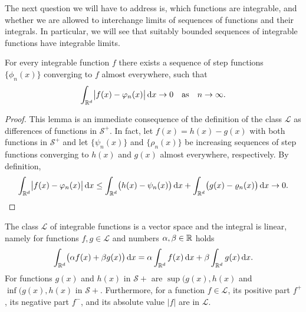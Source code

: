 \begin{intro}
  The next question we will have to address is, which functions are
  integrable, and whether we are allowed to interchange limits of
  sequences of functions and their integrals. In particular, we will
  see that suitably bounded sequences of integrable functions have
  integrable limits.
\end{intro}

\begin{lemma}
  For every integrable function $f$ there exists a sequence of step
  functions $\{\phi_n(x)\}$ converging to $f$ almost everywhere, such
  that
  \begin{gather*}
    \int_{\mathbb R^d} \bigl|f(x)-\varphi_n(x)\bigr|\,\mathrm{d} x \to 0
    \quad\text{as}\quad n\to \infty.
  \end{gather*}
\end{lemma}

\begin{proof}
  This lemma is an immediate consequence of the definition of the
  class $\mathcal L$ as differences of functions in $\mathcal S^+$. In
  fact, let $f(x) = h(x)-g(x)$ with both functions in $\mathcal
  S^+$ and let $\{\psi_n(x)\}$ and $\{\rho_n(x)\}$ be increasing
  sequences of step functions converging to $h(x)$ and $g(x)$
  almost everywhere, respectively. By definition,
  \begin{gather*}
    \int_{\mathbb R^d} \bigl|f(x)-\varphi_n(x)\bigr|\,\mathrm{d} x
    \le \int_{\mathbb R^d} \bigl(h(x)-\psi_n(x)\bigr)\,\mathrm{d} x
    + \int_{\mathbb R^d} \bigl(g(x)-\varrho_n(x)\bigr)\,\mathrm{d} x
    \to 0.
  \end{gather*}
\end{proof}

\begin{theorem}
  \label{theorem:integral:linearity}
  The class $\mathcal L$ of integrable functions is a vector space and
  the integral is linear, namely for functions $f,g\in \mathcal L$ and
  numbers $\alpha,\beta\in \mathbb R$ holds
  \begin{gather}
    \label{eq:integral:3}
    \int_{\mathbb R^d} \bigl(\alpha f(x)+\beta g(x) \bigr)\,\mathrm{d} x
    =\alpha \int_{\mathbb R^d} f(x)\,\mathrm{d} x
    +\beta\int_{\mathbb R^d} g(x)\,\mathrm{d} x.
  \end{gather}
  For functions $g(x)$ and $h(x)$ in $\mathcal S+$ are
  $\sup(g(x),h(x)$ and  $\inf(g(x),h(x)$ in $\mathcal S+$.
  Furthermore, for a function $f\in \mathcal L$, its positive part
  $f^+$, its negative part $f^-$, and its absolute value $|f|$ are in
  $\mathcal L$.
\end{theorem}

